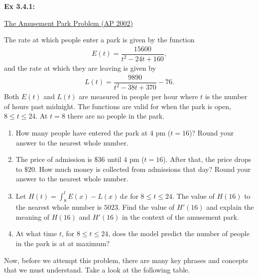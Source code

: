 \begin{tcolorbox}[example]
    \hypertarget{2002 Amusement Park Problem}{} \textbf{Ex 3.4.1: } \begin{center}
        \underline{The Amusement Park Problem (AP 2002)}
    \end{center} \vspace{11pt}
    The rate at which people enter a park is given by the function \begin{align*}
        E(t) = \dfrac{15600}{t^2 - 24t + 160},
    \end{align*} and the rate at which they are leaving is given by \begin{align*}
        L(t) = \dfrac{9890}{t^2 - 38t + 370} - 76.
    \end{align*} Both $E(t)$ and $L(t)$ are measured in people per hour where $t$ is the number of hours past midnight. The functions are valid for when the park is open, $8 \leq t \leq 24$. At $t = 8$ there are no people in the park. \\
    \begin{enumerate}[label=\hspace{11pt}(\alph*), align=left, leftmargin=*, labelsep=0.25em]
        \item How many people have entered the park at $4$ pm ($t = 16$)? Round your answer to the nearest whole number. \\
        \item The price of admission is $\$36$ until $4$ pm ($t = 16$). After that, the price drops to $\$20$. How much money is collected from admissions that day? Round your answer to the nearest whole number. \\
        \item Let $H(t) = \int_8^t E(x) - L(x) \,\mathrm{d}x$ for $8 \leq t \leq 24$. The value of $H(16)$ to the nearest whole number is $5023$. Find the value of $H'(16)$ and explain the meaning of $H(16)$ and $H'(16)$ in the context of the amusement park. \\
        \item At what time $t$, for $8 \leq t \leq 24$, does the model predict the number of people in the park is at at maximum?
    \end{enumerate}
\end{tcolorbox}

Now, before we attempt this problem, there are many key phrases and concepts that we must understand. Take a look at the following table. \par


